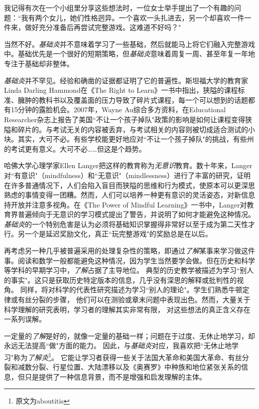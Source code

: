 我记得有次在一个小组里分享这些想法时，一位女士举手提出了一个有趣的问题：``我有两个女儿，她们性格迥异。一个喜欢一头扎进去，另一个却喜欢一件一件来，做好充分准备后再尝试完整游戏。这难道不好吗？"

当然不好。\textit{基础炎}并不意味着学习了一些基础，然后就能马上将它们融入完整游戏中。基础优先是一个很好的短期策略，但\textit{基础炎}意味着周复一周、甚至年复一年地专注于基础却非整体。

\textit{基础炎}并不罕见。经验和确凿的证据都证明了它的普遍性。斯坦福大学的教育家Linda Darling Hammond在《The Right to Learn》一书中指出，狭隘的课程标准、臃肿的教科书以及覆盖面的压力导致了碎片式课程，每一个可以想到的话题都有15分钟的露脸机会。2007年，Wayne Au综合多方资料，在Educational Researcher杂志上报告了美国``不让一个孩子掉队"政策的影响是如何让课程变得狭隘和碎片的。与考试无关的内容被丢弃，与考试相关的内容则被切成适合测试的小块。其实，大可不必。有些学校能更好地应对``不让一个孩子掉队"的挑战，有些州的考试更有意义。大可不必……但这是个趋势。

哈佛大学心理学家Ellen Langer把这样的教育称为\textit{无意识}教育。数十年来，Langer对``有意识"（mindfulness）和``无意识"（mindlessness）进行了丰富的研究，证明在许多普通情况下，人们会陷入盲目而狭隘的思维和行为模式，使原本可以更深思熟虑的事情变得一团糟。然而，人们可以培养一种更有意识的灵活姿态，对新信息持开放并注意多视角。在《The Power of Mindful Learning》一书中，Langer对教育界普遍倾向于无意识的学习模式提出了警告，并说明了如何才能避免这种情况。\textit{基础炎}的一个特别危害是认为必须将基础知识掌握得非常好以至于成为第二天性才行。另一个是延迟奖励文化，真正``玩完整游戏"的奖励总是在以后。

再考虑另一种几乎被普遍采用的处理复杂性的策略，即通过\textit{了解}某事来学习做这件事。阅读和数学一般都能避免这种情况，因为学生当然要学会做。但在历史和科学等学科的早期学习中，\textit{了解}占据了主导地位。
典型的历史教学被描述为学习``别人的事实"。这只是获取历史特定版本的信息，几乎没有深思的解释或批判性的视角。
同样，将对科学的代表性研究描述为学习``别人的理论"。学生们熟悉牛顿定律或有丝分裂的步骤，
他们可以在测验或章末问题中表现出色。然而，大量关于科学理解的研究表明，学习者的理解其实非常有限，
对这些想法的真正含义存在一系列误解。

一定量的\textit{了解}是好的，就像一定量的基础一样；问题在于过度、无休止地学习，却永远无法提高``做"方面的能力。
因此，与\textit{基础炎}对应，我喜欢把``无休止地学习"称为\textit{了解炎}\footnote{原文为aboutitis}。
它能让学习者获得一些关于法国大革命和美国大革命、有丝分裂和减数分裂、行星位置、大陆漂移以及《奥赛罗》中种族和地位紧张关系的信息，但只是提供了一种信息背景，而不是增强和启发理解的主体。

